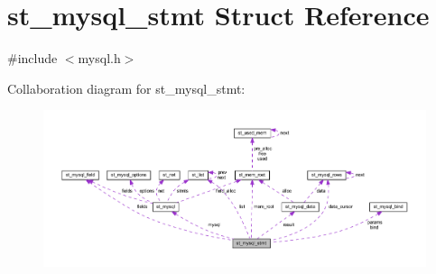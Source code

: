 \hypertarget{structst__mysql__stmt}{}\section{st\+\_\+mysql\+\_\+stmt Struct Reference}
\label{structst__mysql__stmt}


{\ttfamily \#include $<$mysql.\+h$>$}



Collaboration diagram for st\+\_\+mysql\+\_\+stmt\+:\nopagebreak
\begin{figure}[H]
\begin{center}
\leavevmode
\includegraphics[width=350pt]{structst__mysql__stmt__coll__graph}
\end{center}
\end{figure}
